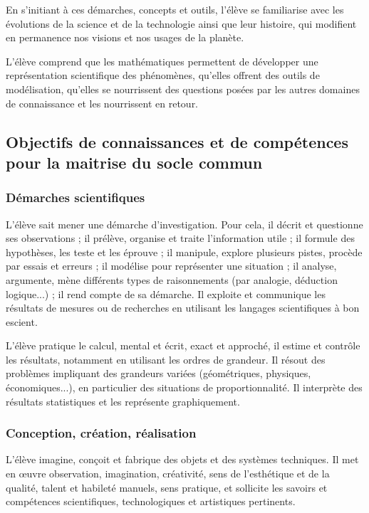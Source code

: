En s’initiant à ces démarches, concepts et outils, l’élève se familiarise avec les évolutions de la science et de la technologie ainsi que leur histoire, qui modifient en permanence nos visions et nos usages de la planète.

L’élève comprend que les mathématiques permettent de développer une représentation scientifique des phénomènes, qu’elles offrent des outils de modélisation, qu’elles se nourrissent des questions posées par les autres domaines de connaissance et les nourrissent en retour.
 
\subsection{Objectifs de connaissances et de compétences pour la maitrise du socle commun}
\subsubsection{Démarches scientifiques}
L’élève sait mener une démarche d’investigation. Pour cela, il décrit et questionne ses observations ; il prélève, organise et traite l’information utile ; il formule des hypothèses, les teste et les éprouve ; il manipule, explore plusieurs pistes, procède par essais et erreurs ; il modélise pour représenter une situation ; il analyse, argumente, mène différents types de raisonnements (par analogie, déduction logique...) ; il rend compte de sa démarche. Il exploite et communique les résultats de mesures ou de recherches en utilisant les langages scientifiques à bon escient.

L’élève pratique le calcul, mental et écrit, exact et approché, il estime et contrôle les résultats, notamment en utilisant les ordres de grandeur. Il résout des problèmes impliquant des grandeurs variées (géométriques, physiques, économiques...), en particulier des situations de proportionnalité. Il interprète des résultats statistiques et les représente graphiquement.

\subsubsection{Conception, création, réalisation}
L’élève imagine, conçoit et fabrique des objets et des systèmes techniques. Il met en œuvre observation, imagination, créativité, sens de l’esthétique et de la qualité, talent et habileté manuels, sens pratique, et sollicite les savoirs et compétences scientifiques, technologiques et artistiques pertinents.


